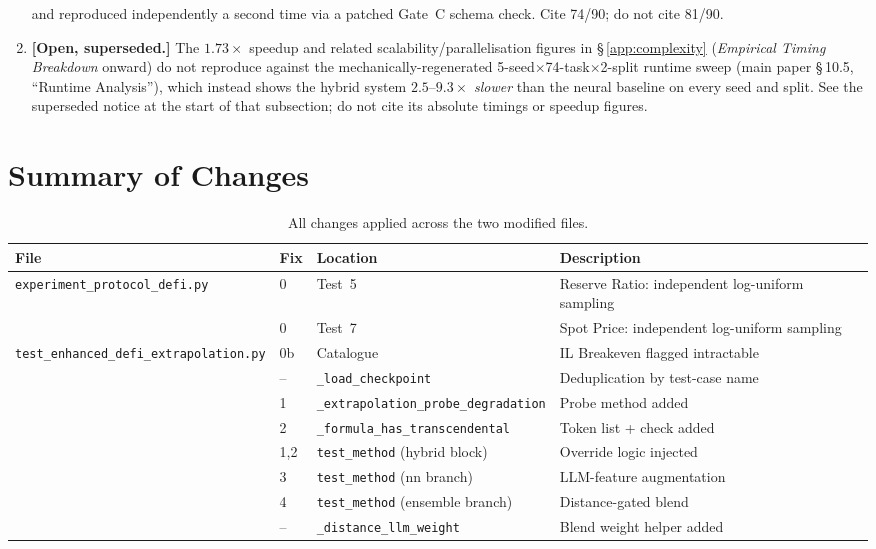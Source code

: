 \documentclass[twoside,11pt]{article}
\begin{document}
\begin{enumerate}[leftmargin=*]
    and reproduced independently a second time via a patched Gate~C
    schema check. Cite 74/90; do not cite 81/90.
  \item \textbf{[Open, superseded.]} The $1.73\times$ speedup and related
    scalability/parallelisation figures in \S\,\ref{app:complexity}
    (\emph{Empirical Timing Breakdown} onward) do not reproduce against
    the mechanically-regenerated 5-seed$\times$74-task$\times$2-split
    runtime sweep (main paper \S\,10.5, ``Runtime Analysis''), which instead shows
    the hybrid system $2.5$--$9.3\times$ \emph{slower} than the neural
    baseline on every seed and split. See the superseded notice at the
    start of that subsection; do not cite its absolute timings or
    speedup figures.
\end{enumerate}

\section{Summary of Changes}
\label{sec:changes}

\begin{table}[h]
\centering
\caption{All changes applied across the two modified files.}
\label{tab:changes}
\begin{tabular}{llll}
\toprule
\textbf{File} & \textbf{Fix} & \textbf{Location} & \textbf{Description} \\
\midrule
\texttt{experiment\_protocol\_defi.py}
  & 0  & Test~5  & Reserve Ratio: independent log-uniform sampling \\
  & 0  & Test~7  & Spot Price: independent log-uniform sampling \\
\midrule
\texttt{test\_enhanced\_defi\_extrapolation.py}
  & 0b & Catalogue     & IL Breakeven flagged intractable \\
  & -- & \texttt{\_load\_checkpoint} & Deduplication by test-case name \\
  & 1  & \texttt{\_extrapolation\_probe\_degradation} & Probe method added \\
  & 2  & \texttt{\_formula\_has\_transcendental} & Token list + check added \\
  & 1,2& \texttt{test\_method} (hybrid block) & Override logic injected \\
  & 3  & \texttt{test\_method} (nn branch)     & LLM-feature augmentation \\
  & 4  & \texttt{test\_method} (ensemble branch) & Distance-gated blend \\
  & -- & \texttt{\_distance\_llm\_weight} & Blend weight helper added \\
\bottomrule
\end{tabular}
\end{table}
\end{document}
